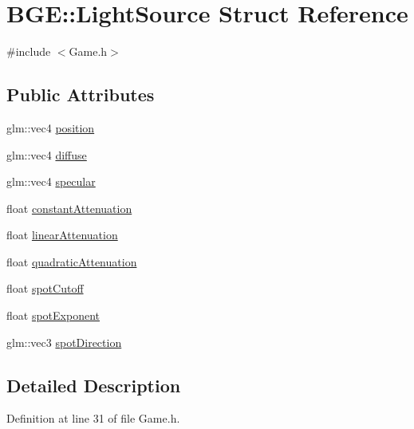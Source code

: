 \hypertarget{struct_b_g_e_1_1_light_source}{\section{B\-G\-E\-:\-:Light\-Source Struct Reference}
\label{struct_b_g_e_1_1_light_source}
}


{\ttfamily \#include $<$Game.\-h$>$}

\subsection*{Public Attributes}
\begin{DoxyCompactItemize}
\item 
glm\-::vec4 \hyperlink{struct_b_g_e_1_1_light_source_a31af9cd6a4686eeaacdb990150512cc3}{position}
\item 
glm\-::vec4 \hyperlink{struct_b_g_e_1_1_light_source_a6b4fb0c330f4406c5bd4e6464302032a}{diffuse}
\item 
glm\-::vec4 \hyperlink{struct_b_g_e_1_1_light_source_ad722db2928ed5e2ab40dbb2ca44c1b00}{specular}
\item 
float \hyperlink{struct_b_g_e_1_1_light_source_a9dc7cb4becd1804de3a34331dd5c5eaf}{constant\-Attenuation}
\item 
float \hyperlink{struct_b_g_e_1_1_light_source_aea595573245115130d4d5f2ccdebecc1}{linear\-Attenuation}
\item 
float \hyperlink{struct_b_g_e_1_1_light_source_a581921dd0a5dff19b57b65a9995d06fa}{quadratic\-Attenuation}
\item 
float \hyperlink{struct_b_g_e_1_1_light_source_adb5adef9bf599b87ddcd2b20c63213c4}{spot\-Cutoff}
\item 
float \hyperlink{struct_b_g_e_1_1_light_source_a7ac674489774666e22a29661df8b0d3e}{spot\-Exponent}
\item 
glm\-::vec3 \hyperlink{struct_b_g_e_1_1_light_source_a8e4da47dd39e89932cda39938d92c90c}{spot\-Direction}
\end{DoxyCompactItemize}


\subsection{Detailed Description}


Definition at line 31 of file Game.\-h.



